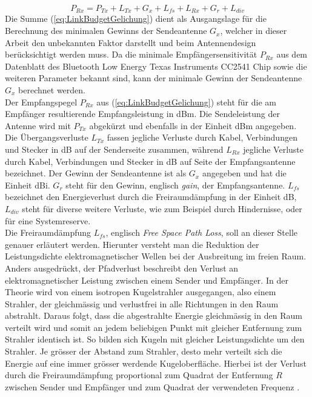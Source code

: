 \begin{equation}
P_{Rx} = P_{Tx}+L_{Tx}+G_{x}+L_{fs}+L_{Rx}+G_{r}+L_{div}\label{eq:LinkBudgetGelichung}
\end{equation}
Die Summe (\ref{eq:LinkBudgetGelichung}) dient als Ausgangslage für die Berechnung des minimalen Gewinns der Sendeantenne $G_{x}$, welcher in dieser Arbeit den unbekannten Faktor darstellt und beim Antennendesign berücksichtigt werden muss. Da die minimale Empfängersensitivität $P_{Rx}$ aus dem Datenblatt des Bluetooth Low Energy Texas Instruments CC2541 Chip sowie die weiteren Parameter bekannt sind, kann der minimale Gewinn der Sendeantenne $G_{x}$ berechnet werden. \\
Der Empfangspegel $P_{Rx}$ aus (\ref{eq:LinkBudgetGelichung}) steht für die am Empfänger resultierende Empfangsleistung in dBm. Die Sendeleistung der Antenne wird mit $P_{Tx}$ abgekürzt und ebenfalls in der Einheit dBm angegeben. Die Übergangsverluste $L_{Tx}$ fassen jegliche Verluste durch Kabel, Verbindungen und Stecker in dB auf der Senderseite zusammen, während $L_{Rx}$ jegliche Verluste durch Kabel, Verbindungen und Stecker in dB auf Seite der Empfangsantenne bezeichnet. Der Gewinn der Sendeantenne ist als $G_{x}$ angegeben und hat die Einheit dBi. $G_{r}$ steht für den Gewinn, englisch \textit{gain}, der Empfangsantenne. $L_{fs}$ bezeichnet den Energieverlust durch die Freiraumdämpfung in der Einheit dB, $L_{div}$ steht für diverse weitere Verluste, wie zum Beispiel durch Hindernisse, oder für eine Systemreserve. \\
Die Freiraumdämpfung $L_{fs}$, englisch \textit{Free Space Path Loss}, soll an dieser Stelle genauer erläutert werden. Hierunter versteht man die Reduktion der Leistungsdichte elektromagnetischer Wellen bei der Ausbreitung im freien Raum. Anders ausgedrückt, der Pfadverlust beschreibt den Verlust an elektromagnetischer Leistung zwischen einem Sender und Empfänger. In der Theorie wird von einem isotropen Kugelstrahler ausgegangen, also einem Strahler, der gleichmässig und verlustfrei in alle Richtungen in den Raum abstrahlt. Daraus folgt, dass die abgestrahlte Energie gleichmässig in den Raum verteilt wird und somit an jedem beliebigen Punkt mit gleicher Entfernung zum Strahler identisch ist. So bilden sich Kugeln mit gleicher Leistungsdichte um den Strahler. Je grösser der Abstand zum Strahler, desto mehr verteilt sich die Energie auf eine immer grösser werdende Kugeloberfläche. Hierbei ist der Verlust durch die Freiraumdämpfung proportional zum Quadrat der Entfernung $R$ zwischen Sender und Empfänger und zum Quadrat der verwendeten Frequenz \cite{linkbudget}.
\clearpage
\newpage

